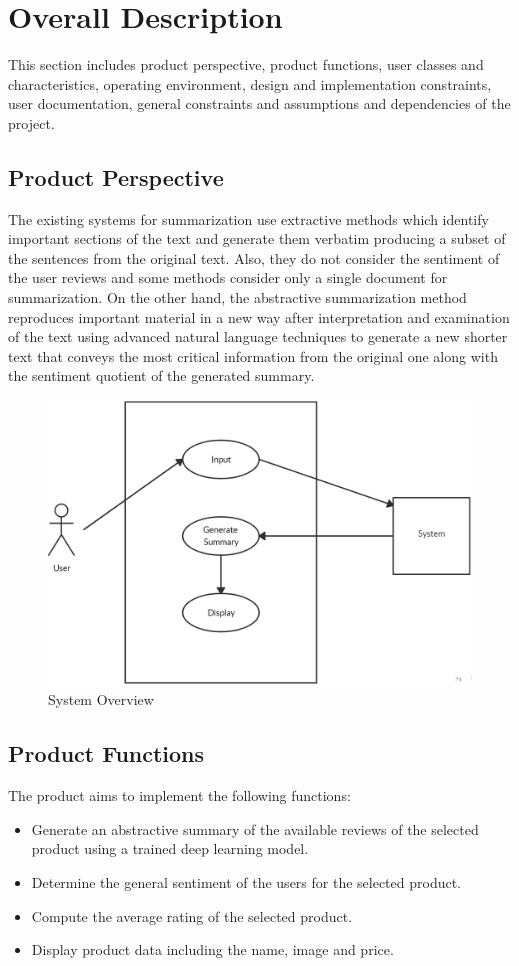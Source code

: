 \documentclass[11pt]{report}
\begin{document}
\newpage
\section{Overall Description}
This section includes product perspective, product functions, user classes and characteristics, operating environment, design and implementation constraints, user documentation, general constraints and assumptions and dependencies of the project.

\subsection{Product Perspective}
The existing systems for summarization use extractive methods which identify important sections of the text and generate them verbatim producing a subset of the sentences from the original text. Also, they do not consider the sentiment of the user reviews and some methods consider only a single document for summarization. On the other hand, the abstractive summarization method reproduces important material in a new way after interpretation and examination of the text using advanced natural language techniques to generate a new shorter text that conveys the most critical information from the original one along with the sentiment quotient of the generated summary.
\begin{figure}[H]
\centering
\includegraphics[scale=0.5]{images/SystemOverview.png}
\caption{System Overview}
\label{fig:system overview}
\end{figure}
\pagebreak
\subsection{Product Functions}
The product aims to implement the following functions:
\begin{itemize}
\item Generate an abstractive summary of the available reviews of the selected product using a trained deep learning model.
\item Determine the general sentiment of the users for the selected product.
\item Compute the average rating of the selected product.
\item Display product data including the name, image and price.
\end{itemize}
\end{document}
